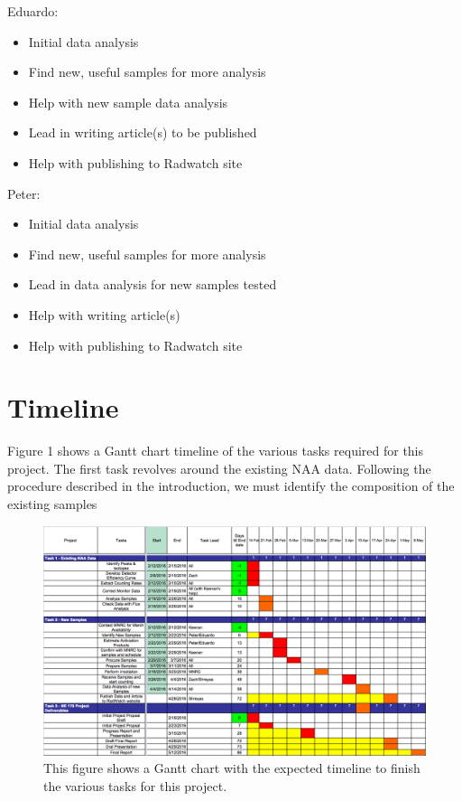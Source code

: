 \documentclass[]{article}
\begin{document}
Eduardo:
\begin{itemize}
\item Initial data analysis
\item Find new, useful samples for more analysis
\item Help with new sample data analysis
\item Lead in writing article(s) to be published
\item Help with publishing to Radwatch site
\end{itemize}

Peter:
\begin{itemize}
\item Initial data analysis
\item Find new, useful samples for more analysis
\item Lead in data analysis for new samples tested
\item Help with writing article(s)
\item Help with publishing to Radwatch site
\end{itemize}


\section{Timeline}

Figure 1 shows a Gantt chart timeline of the various tasks required for this project. The first task revolves around the existing NAA data. Following the procedure described in the introduction, we must identify the composition of the existing samples  

\begin{figure}[h]
\centering
\includegraphics[scale=0.4]{GanttChart}
\caption{This figure shows a Gantt chart with the expected timeline to finish the various tasks for this project.}
\end{figure} 
\end{document}

